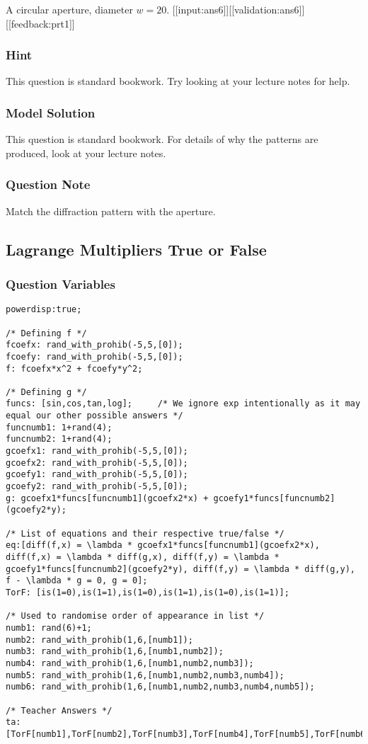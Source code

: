 \documentclass[a4paper,10pt]{article}
\begin{document}
A circular aperture, diameter $w=20$.   [[input:ans6]][[validation:ans6]] [[feedback:prt1]]
\subsubsection{Hint}
This question is standard bookwork. Try looking at your lecture notes for help.
\subsubsection{Model Solution}
This question is standard bookwork. For details of why the patterns are produced, look at your lecture notes.
\subsubsection{Question Note}
Match the diffraction pattern with the aperture.

\subsection{Lagrange Multipliers True or False}
\subsubsection{Question Variables}
\begin{lstlisting}
powerdisp:true;

/* Defining f */
fcoefx: rand_with_prohib(-5,5,[0]);
fcoefy: rand_with_prohib(-5,5,[0]);
f: fcoefx*x^2 + fcoefy*y^2;

/* Defining g */
funcs: [sin,cos,tan,log];     /* We ignore exp intentionally as it may equal our other possible answers */
funcnumb1: 1+rand(4);
funcnumb2: 1+rand(4);
gcoefx1: rand_with_prohib(-5,5,[0]);
gcoefx2: rand_with_prohib(-5,5,[0]);
gcoefy1: rand_with_prohib(-5,5,[0]);
gcoefy2: rand_with_prohib(-5,5,[0]);
g: gcoefx1*funcs[funcnumb1](gcoefx2*x) + gcoefy1*funcs[funcnumb2](gcoefy2*y);

/* List of equations and their respective true/false */
eq:[diff(f,x) = \lambda * gcoefx1*funcs[funcnumb1](gcoefx2*x), diff(f,x) = \lambda * diff(g,x), diff(f,y) = \lambda * gcoefy1*funcs[funcnumb2](gcoefy2*y), diff(f,y) = \lambda * diff(g,y), f - \lambda * g = 0, g = 0];
TorF: [is(1=0),is(1=1),is(1=0),is(1=1),is(1=0),is(1=1)];

/* Used to randomise order of appearance in list */
numb1: rand(6)+1;
numb2: rand_with_prohib(1,6,[numb1]);
numb3: rand_with_prohib(1,6,[numb1,numb2]);
numb4: rand_with_prohib(1,6,[numb1,numb2,numb3]);
numb5: rand_with_prohib(1,6,[numb1,numb2,numb3,numb4]);
numb6: rand_with_prohib(1,6,[numb1,numb2,numb3,numb4,numb5]);

/* Teacher Answers */
ta: [TorF[numb1],TorF[numb2],TorF[numb3],TorF[numb4],TorF[numb5],TorF[numb6]];
\end{lstlisting}
\end{document}
